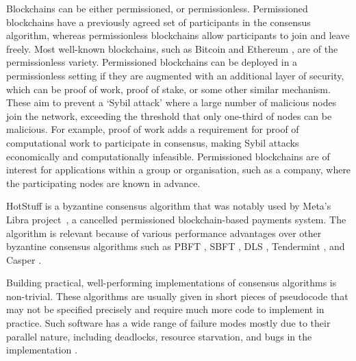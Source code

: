 Blockchains can be either permissioned, or permissionless. Permissioned blockchains have a previously agreed set of participants in the consensus algorithm, whereas permissionless blockchains allow participants to join and leave freely. Most well-known blockchains, such as Bitcoin \cite{nakamotoBitcoinPeertoPeerElectronic2008} and Ethereum \cite{ethereumWhite, ethereumYellow}, are of the permissionless variety. Permissioned blockchains can be deployed in a permissionless setting if they are augmented with an additional layer of security, which can be proof of work, proof of stake, or some other similar mechanism. These aim to prevent a `Sybil attack' where a large number of malicious nodes join the network, exceeding the threshold that only one-third of nodes can be malicious. For example, proof of work adds a requirement for proof of computational work to participate in consensus, making Sybil attacks economically and computationally infeasible. Permissioned blockchains are of interest for applications within a group or organisation, such as a company, where the participating nodes are known in advance.

HotStuff is a byzantine consensus algorithm that was notably used by Meta's Libra \mbox{project \cite{baudetStateMachineReplication2019}}, a cancelled permissioned blockchain-based payments system. The algorithm is relevant because of various performance advantages over other byzantine consensus algorithms such as PBFT \cite{castroPracticalByzantineFault1999}, SBFT \cite{golanguetaSBFTScalableDecentralized2019}, DLS \cite{dworkConsensusPresencePartial1988}, Tendermint \cite{kwonTendermintConsensusMining2014}, and Casper \cite{buterinCasperFriendlyFinality2019}.

Building practical, well-performing implementations of consensus algorithms is non-trivial. These algorithms are usually given in short pieces of pseudocode that may not be specified precisely and require much more code to implement in practice. Such software has a wide range of failure modes mostly due to their parallel nature, including deadlocks, resource starvation, and bugs in the implementation \cite{chandraPaxosMadeLive2007}.

